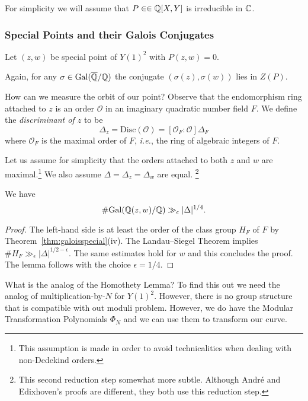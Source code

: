 For simplicity we will assume that $P\in \in{\mathbb{Q}}[X,Y]$ is irreducible
in ${\mathbb{C}}$. 

\subsubsection{Special Points and their Galois Conjugates}

Let $(z,w)$ be special point of $Y(1)^2$ with $P(z,w)=0$.

Again, for any $\sigma\in \mathrm{Gal}({\overline{\mathbb{Q}}}/{\mathbb{Q}})$ the conjugate
$(\sigma(z),\sigma(w))$ lies in $Z(P)$.

How can we measure the orbit of our point? Observe that the
endomorphism ring attached to $z$ is an order $\mathcal{O}$ in an imaginary
quadratic number field $F$. We define the \emph{discriminant of $z$}
to be 
\begin{equation*}
  \Delta_z = \mathrm{Disc}(\mathcal{O}) = [\mathcal{O}_F:\mathcal{O}] \Delta_F
\end{equation*}
where $\mathcal{O}_F$ is the maximal order of $F$, \textit{i.e.}, the
ring of algebraic integers of $F$. 

Let us assume for simplicity that the orders attached to 
both $z$ and $w$ are maximal.\footnote{This assumption is made in
  order to avoid technicalities when dealing with non-Dedekind
  orders.}
We also assume $\Delta =
\Delta_z=\Delta_w$ are equal. \footnote{This second reduction step
  somewhat more subtle.
  Although Andr\'e and Edixhoven's proofs are different, they both use
  this reduction step.}

\begin{lemma}
  We have
  \begin{equation*}
    \# \mathrm{Gal}({\mathbb{Q}}(z,w)/{\mathbb{Q}}) \gg_\epsilon
    |\Delta|^{1/4}. 
  \end{equation*}
\end{lemma}
\begin{proof}
  The left-hand side is at least the order of the class group $H_F$ of $F$ by
  Theorem~\ref{thm:galoisspecial}(iv). The Landau--Siegel Theorem
  implies $\# H_F \gg_\epsilon |\Delta|^{1/2-\epsilon}$. 
  The same estimates hold for $w$ and this concludes the proof.
  The lemma follows with the choice $\epsilon =1/4$. 
\end{proof}

What is the analog of the Homothety Lemma? To find this out we need
the analog of multiplication-by-$N$ for $Y(1)^2$. However, there is
no group structure that is compatible with out moduli problem.
However, we do have the Modular Transformation Polynomials $\Phi_N$
and we can use them to transform our curve.

